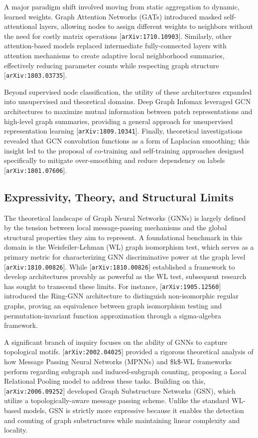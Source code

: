 \documentclass[11pt]{article}
\begin{document}
A major paradigm shift involved moving from static aggregation to dynamic, learned weights. Graph Attention Networks (GATs) introduced masked self-attentional layers, allowing nodes to assign different weights to neighbors without the need for costly matrix operations [\texttt{arXiv:1710.10903}]. Similarly, other attention-based models replaced intermediate fully-connected layers with attention mechanisms to create adaptive local neighborhood summaries, effectively reducing parameter counts while respecting graph structure [\texttt{arXiv:1803.03735}].

Beyond supervised node classification, the utility of these architectures expanded into unsupervised and theoretical domains. Deep Graph Infomax leveraged GCN architectures to maximize mutual information between patch representations and high-level graph summaries, providing a general approach for unsupervised representation learning [\texttt{arXiv:1809.10341}]. Finally, theoretical investigations revealed that GCN convolution functions as a form of Laplacian smoothing; this insight led to the proposal of co-training and self-training approaches designed specifically to mitigate over-smoothing and reduce dependency on labels [\texttt{arXiv:1801.07606}].

\subsection{Expressivity, Theory, and Structural Limits}

The theoretical landscape of Graph Neural Networks (GNNs) is largely defined by the tension between local message-passing mechanisms and the global structural properties they aim to represent. A foundational benchmark in this domain is the Weisfeiler-Lehman (WL) graph isomorphism test, which serves as a primary metric for characterizing GNN discriminative power at the graph level [\texttt{arXiv:1810.00826}]. While [\texttt{arXiv:1810.00826}] established a framework to develop architectures provably as powerful as the WL test, subsequent research has sought to transcend these limits. For instance, [\texttt{arXiv:1905.12560}] introduced the Ring-GNN architecture to distinguish non-isomorphic regular graphs, proving an equivalence between graph isomorphism testing and permutation-invariant function approximation through a sigma-algebra framework.

A significant branch of inquiry focuses on the ability of GNNs to capture topological motifs. [\texttt{arXiv:2002.04025}] provided a rigorous theoretical analysis of how Message Passing Neural Networks (MPNNs) and \$k\$-WL frameworks perform regarding subgraph and induced-subgraph counting, proposing a Local Relational Pooling model to address these tasks. Building on this, [\texttt{arXiv:2006.09252}] developed Graph Substructure Networks (GSN), which utilize a topologically-aware message passing scheme. Unlike the standard WL-based models, GSN is strictly more expressive because it enables the detection and counting of graph substructures while maintaining linear complexity and locality.
\end{document}
